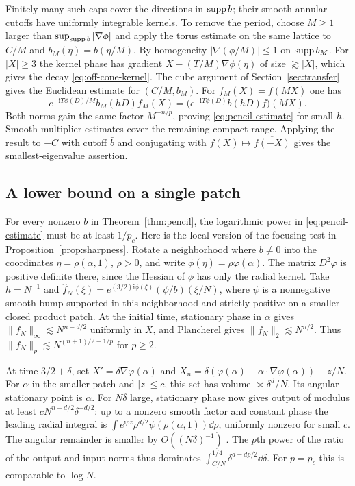 Finitely many such caps cover the directions in $\operatorname{supp} b$; their smooth
annular cutoffs have uniformly integrable kernels. To remove the period,
choose $M\ge1$ larger than $\sup_{\operatorname{supp} b}|\nabla\phi|$ and apply the
torus estimate on the same lattice to $C/M$ and $b_M(\eta)=b(\eta/M)$.
By homogeneity $|\nabla(\phi/M)|\le1$ on $\operatorname{supp} b_M$. For $|X|\ge3$ the
kernel phase has gradient $X-(T/M)\nabla\phi(\eta)$ of size $\gtrsim |X|$,
which gives the decay \eqref{eq:off-cone-kernel}. The cube argument of
Section~\ref{sec:transfer} gives the Euclidean estimate for $(C/M,b_M)$.
For $f_M(X)=f(MX)$ one has
\[
 e^{-\mathrm iT\phi(D)/M}b_M(hD)f_M(X)
 =\big(e^{-\mathrm iT\phi(D)}b(hD)f\big)(MX).
\]
Both norms gain the same factor $M^{-n/p}$, proving \eqref{eq:pencil-estimate}
for small $h$. Smooth multiplier estimates cover the remaining compact
range. Applying the result to $-C$ with cutoff $\bar b$ and conjugating
with $f(X)\mapsto\overline{f(-X)}$ gives the smallest-eigenvalue assertion.

\subsection{A lower bound on a single patch}
For every nonzero $b$ in Theorem~\ref{thm:pencil}, the logarithmic power
in \eqref{eq:pencil-estimate} must be at least $1/p_c$. Here is the
local version of the focusing test in Proposition~\ref{prop:sharpness}.
Rotate a neighborhood where $b\ne0$ into the coordinates
$\eta=\rho(\alpha,1)$, $\rho>0$, and write
$\phi(\eta)=\rho\varphi(\alpha)$. The matrix $D^2\varphi$ is positive
definite there, since the Hessian of $\phi$ has only the radial kernel.
Take $h=N^{-1}$ and
$\widehat f_N(\xi)=e^{(3/2)\mathrm i\phi(\xi)}(\psi/b)(\xi/N)$,
where $\psi$ is a nonnegative smooth bump supported in this neighborhood
and strictly positive on a smaller closed product patch. At the initial
time, stationary phase in $\alpha$ gives $\|f_N\|_\infty\lesssim N^{n-d/2}$ uniformly
in $X$, and Plancherel gives $\|f_N\|_2\lesssim N^{n/2}$. Thus
$\|f_N\|_p\lesssim N^{(n+1)/2-1/p}$ for $p\ge2$.

At time $3/2+\delta$, set
$X'=\delta\nabla\varphi(\alpha)$ and
$X_n=\delta(\varphi(\alpha)-\alpha\cdot\nabla\varphi(\alpha))+z/N$.
For $\alpha$ in the smaller patch and $|z|\le c$, this set has volume
$\asymp\delta^d/N$. Its angular stationary point is $\alpha$.
For $N\delta$ large, stationary phase now gives output of modulus at least
$cN^{n-d/2}\delta^{-d/2}$: up to a nonzero smooth factor and constant
phase the leading radial integral is
$\int e^{\mathrm i\rho z}\rho^{d/2}\psi(\rho(\alpha,1))\dd\rho$,
uniformly nonzero for small $c$. The angular remainder is smaller by
$O((N\delta)^{-1})$ \cite[Chapter~VIII]{Stein1993}. The $p$th power of
the ratio of the output and input norms thus dominates
$\int_{C/N}^{1/4}\delta^{d-dp/2}\dd\delta$. For $p=p_c$ this is
comparable to $\log N$.
